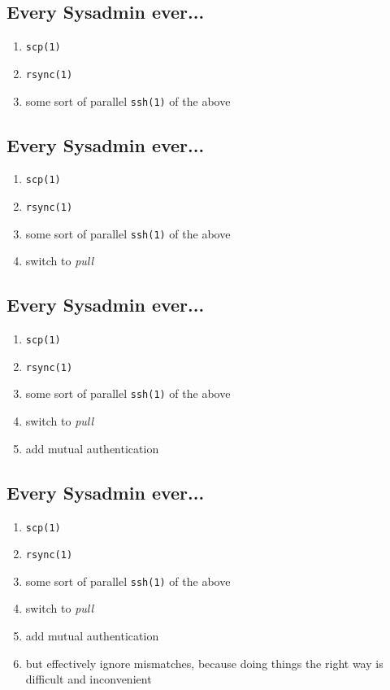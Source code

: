 \documentclass[xga]{xdvislides}
\begin{document}
\subsection{Every Sysadmin ever...}
\begin{enumerate}
	\item {\tt scp(1)}
	\item {\tt rsync(1)}
	\item some sort of parallel {\tt ssh(1)} of the above
\end{enumerate}

\subsection{Every Sysadmin ever...}
\begin{enumerate}
	\item {\tt scp(1)}
	\item {\tt rsync(1)}
	\item some sort of parallel {\tt ssh(1)} of the above
	\item switch to {\em pull}
\end{enumerate}

\subsection{Every Sysadmin ever...}
\begin{enumerate}
	\item {\tt scp(1)}
	\item {\tt rsync(1)}
	\item some sort of parallel {\tt ssh(1)} of the above
	\item switch to {\em pull}
	\item add mutual authentication
\end{enumerate}

\subsection{Every Sysadmin ever...}
\begin{enumerate}
	\item {\tt scp(1)}
	\item {\tt rsync(1)}
	\item some sort of parallel {\tt ssh(1)} of the above
	\item switch to {\em pull}
	\item add mutual authentication
	\item but effectively ignore mismatches, because doing things the right way is difficult and inconvenient
\end{enumerate}
\end{document}
